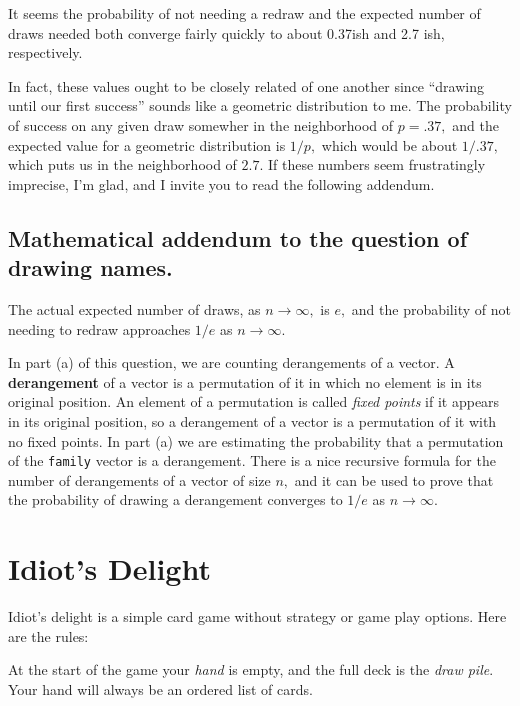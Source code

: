 \documentclass[
]{book}
\theoremstyle{definition}
\theoremstyle{definition}
\theoremstyle{definition}
\theoremstyle{definition}
\theoremstyle{remark}
\begin{document}
It seems the probability of not needing a redraw and the expected number of draws needed both converge fairly quickly to about 0.37ish and 2.7 ish, respectively.

In fact, these values ought to be closely related of one another since ``drawing until our first success'' sounds like a geometric distribution to me. The probability of success on any given draw somewher in the neighborhood of \(p = .37,\) and the expected value for a geometric distribution is \(1/p,\) which would be about \(1/.37,\) which puts us in the neighborhood of \(2.7\).
If these numbers seem frustratingly imprecise, I'm glad, and I invite you to read the following addendum.

\subsection*{Mathematical addendum to the question of drawing names.}\label{mathematical-addendum-to-the-question-of-drawing-names.}

The actual expected number of draws, as \(n \to \infty,\) is \(e,\) and the probability of not needing to redraw approaches \(1/e\) as \(n \to \infty\).

In part (a) of this question, we are counting derangements of a vector.
A \textbf{derangement} of a vector is a permutation of it in which no element is in its original position. An element of a permutation is called \emph{fixed points} if it appears in its original position, so a derangement of a vector is a permutation of it with no fixed points. In part (a) we are estimating the probability that a permutation of the \texttt{family} vector is a derangement. There is a nice recursive formula for the number of derangements of a vector of size \(n,\) and it can be used to prove that the probability of drawing a derangement converges to \(1/e\) as \(n \to \infty\).

\section{Idiot's Delight}\label{idiots-delight}

Idiot's delight is a simple card game without strategy or game play options. Here are the rules:

At the start of the game your \emph{hand} is empty, and the full deck is the \emph{draw pile}. Your hand will always be an ordered list of cards.
\end{document}

